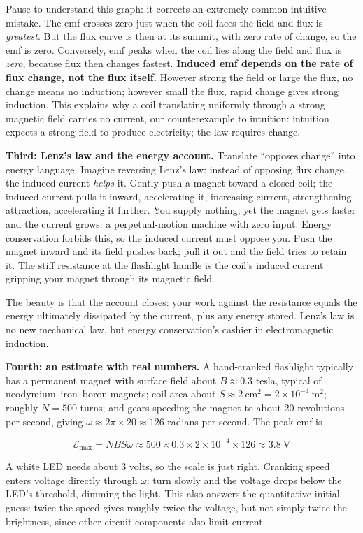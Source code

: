 Pause to understand this graph: it corrects an extremely common intuitive mistake. The emf crosses zero just when the coil faces the field and flux is \emph{greatest}. But the flux curve is then at its summit, with zero rate of change, so the emf is zero. Conversely, emf peaks when the coil lies along the field and flux is \emph{zero}, because flux then changes fastest. \textbf{Induced emf depends on the rate of flux change, not the flux itself.} However strong the field or large the flux, no change means no induction; however small the flux, rapid change gives strong induction. This explains why a coil translating uniformly through a strong magnetic field carries no current, our counterexample to intuition: intuition expects a strong field to produce electricity; the law requires change.

\textbf{Third: Lenz's law and the energy account.} Translate ``opposes change'' into energy language. Imagine reversing Lenz's law: instead of opposing flux change, the induced current \emph{helps} it. Gently push a magnet toward a closed coil; the induced current pulls it inward, accelerating it, increasing current, strengthening attraction, accelerating it further. You supply nothing, yet the magnet gets faster and the current grows: a perpetual-motion machine with zero input. Energy conservation forbids this, so the induced current must oppose you. Push the magnet inward and its field pushes back; pull it out and the field tries to retain it. The stiff resistance at the flashlight handle is the coil's induced current gripping your magnet through its magnetic field.

The beauty is that the account closes: your work against the resistance equals the energy ultimately dissipated by the current, plus any energy stored. Lenz's law is no new mechanical law, but energy conservation's cashier in electromagnetic induction.

\textbf{Fourth: an estimate with real numbers.} A hand-cranked flashlight typically has a permanent magnet with surface field about \(B\approx 0.3\) tesla, typical of neodymium--iron--boron magnets; coil area about \(S\approx 2\ \mathrm{cm^2}=2\times10^{-4}\ \mathrm{m^2}\); roughly \(N=500\) turns; and gears speeding the magnet to about 20 revolutions per second, giving \(\omega\approx 2\pi\times20\approx 126\) radians per second. The peak emf is

\[
\mathcal{E}_{\max}=NBS\omega \approx 500\times0.3\times2\times10^{-4}\times126\approx 3.8\ \mathrm{V}
\]

A white LED needs about 3 volts, so the scale is just right. Cranking speed enters voltage directly through \(\omega\): turn slowly and the voltage drops below the LED's threshold, dimming the light. This also answers the quantitative initial guess: twice the speed gives roughly twice the voltage, but not simply twice the brightness, since other circuit components also limit current.


